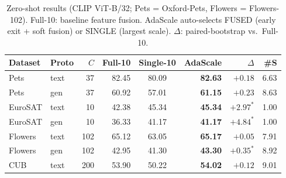 \begin{table}[t]
\centering
\caption{Zero-shot results (CLIP ViT-B/32; Pets = Oxford-Pets, Flowers = Flowers-102). Full-10: baseline feature fusion. AdaScale auto-selects FUSED (early exit + soft fusion) or SINGLE (largest scale). $\Delta$: paired-bootstrap vs.\ Full-10.}
\label{tab:main}
\small
\setlength{\tabcolsep}{2pt}
\begin{tabular}{llrrcrrr}
\hline
Dataset & Proto & $C$ & Full-10 & Single-10 & AdaScale & $\Delta$ & \#S \\
\hline
Pets & text & 37 & 82.45 & 80.09 & \textbf{82.63} & $+0.18$ & 6.63 \\
Pets & gen & 37 & 60.92 & 57.01 & \textbf{61.15} & $+0.23$ & 8.63 \\
EuroSAT & text & 10 & 42.38 & 45.34 & \textbf{45.34} & $+2.97^{*}$ & 1.00 \\
EuroSAT & gen & 10 & 36.33 & 41.17 & \textbf{41.17} & $+4.84^{*}$ & 1.00 \\
Flowers & text & 102 & 65.12 & 63.05 & \textbf{65.17} & $+0.05$ & 7.91 \\
Flowers & gen & 102 & 42.95 & 41.30 & \textbf{43.30} & $+0.35^{*}$ & 8.92 \\
CUB & text & 200 & 53.90 & 50.22 & \textbf{54.02} & $+0.12$ & 9.01 \\
\hline
\end{tabular}
\end{table}
